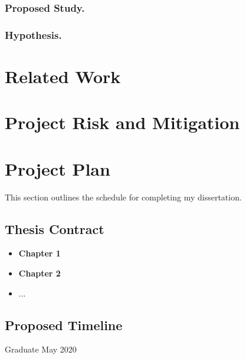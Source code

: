 \documentclass[runningheads]{llncs}
\begin{document}
\subsubsection{Proposed Study.} 

\subsubsection{Hypothesis.} 

\section{Related Work}

\section{Project Risk and Mitigation}

\section{Project Plan}

This section outlines the schedule for completing my dissertation.


\subsection{Thesis Contract}

\begin{itemize}
  \item \textbf{Chapter 1}
  \item \textbf{Chapter 2}
  \item ...
\end{itemize}

\subsection{Proposed Timeline}
Graduate May 2020

%
%
%
% 
% 
%


\end{document}
